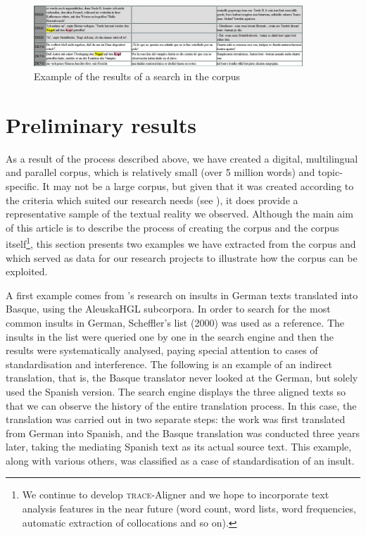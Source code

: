 \documentclass[output=paper]{LSP/langsci}
\begin{document}
\begin{figure}
\includegraphics[width=0.9\textwidth]{./figures/6-7.jpg} 
\caption{Example of the results of a search in the corpus} \label{fig:3:7}
\end{figure}

\section{Preliminary results}
As a result of the process described above, we have created a digital, multilingual and parallel corpus, which is relatively small (over 5 million words) and topic-specific. It may not be a large corpus, but given that it was created according to the criteria which suited our research needs (see ), it does provide a representative sample of the textual reality we observed. Although the main aim of this article is to describe the process of creating the corpus and the corpus itself\footnote{We continue to develop \textsc{trace}-Aligner and we hope to incorporate text analysis features in the near future (word count, word lists, word frequencies, automatic extraction of collocations and so on).}, this section presents two examples we have extracted from the corpus and which served as data for our research projects to illustrate how the corpus can be exploited.

A first example comes from \citeauthor{Zubillaga2013}'s \citeyear{Zubillaga2013} research on insults in German texts translated into Basque, using the AleuskaHGL subcorpora. In order to search for the most common insults in German, Scheffler's list (2000) was used as a reference. The insults in the list were queried one by one in the search engine and then the results were systematically analysed, paying special attention to cases of standardisation and interference. The following is an example of an indirect translation, that is, the Basque translator never looked at the German, but solely used the Spanish version. The search engine displays the three aligned texts so that we can observe the history of the entire translation process. In this case, the translation was carried out in two separate steps: the work was first translated from German into Spanish, and the Basque translation was conducted three years later, taking the mediating Spanish text as its actual source text. This example, along with various others, was classified as a case of standardisation of an insult.
\end{document}
